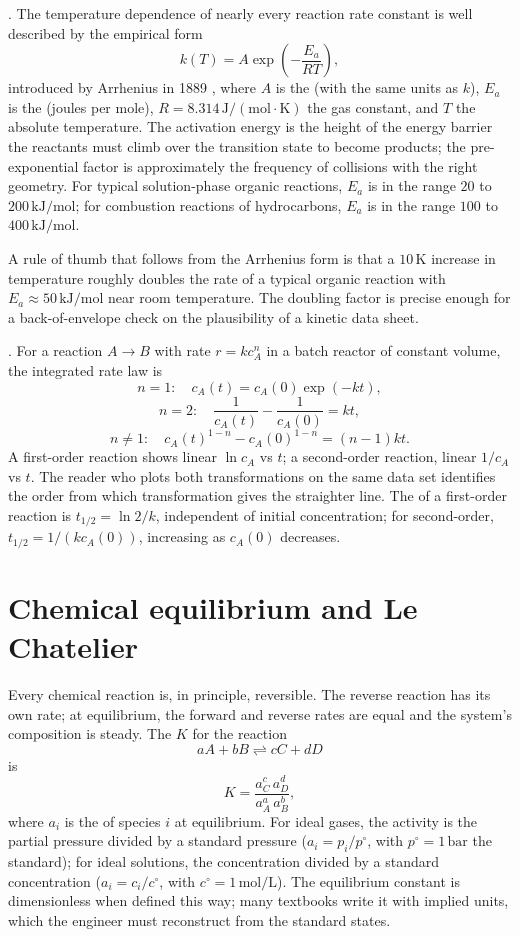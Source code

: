 . The temperature dependence of nearly
every reaction rate constant is well described by the empirical form
\[
k(T) = A \exp\left(-\frac{E_a}{R T}\right),
\]
introduced by Arrhenius in 1889 \cite{hist:arrhenius1889}, where $A$
is the  (with the same units as $k$),
$E_a$ is the  (joules per mole), $R =
8.314\,\text{J}/(\text{mol}\cdot\si{\kelvin})$ the gas constant, and
$T$ the absolute temperature. The activation energy is the height of
the energy barrier the reactants must climb over the transition state
to become products; the pre-exponential factor is approximately the
frequency of collisions with the right geometry. For typical
solution-phase organic reactions, $E_a$ is in the range $20$ to $200\,
\text{kJ}/\text{mol}$; for combustion reactions of hydrocarbons,
$E_a$ is in the range $100$ to $400\,\text{kJ}/\text{mol}$.

A rule of thumb that follows from the Arrhenius form is that a
$10\,\si{\kelvin}$ increase in temperature roughly doubles the rate
of a typical organic reaction with $E_a \approx 50\,\text{kJ}/\text{mol}$
near room temperature. The doubling factor is precise enough for a
back-of-envelope check on the plausibility of a kinetic data sheet.

. For a reaction $A \to B$ with
rate $r = k c_A^n$ in a batch reactor of constant volume, the
integrated rate law is
\[
n = 1: \quad c_A(t) = c_A(0) \exp(-k t),
\]
\[
n = 2: \quad \frac{1}{c_A(t)} - \frac{1}{c_A(0)} = k t,
\]
\[
n \neq 1: \quad c_A(t)^{1-n} - c_A(0)^{1-n} = (n-1) k t.
\]
A first-order reaction shows linear $\ln c_A$ vs $t$; a second-order
reaction, linear $1/c_A$ vs $t$. The reader who plots both
transformations on the same data set identifies the order from which
transformation gives the straighter line. The  of a
first-order reaction is $t_{1/2} = \ln 2/k$, independent of initial
concentration; for second-order, $t_{1/2} = 1/(k c_A(0))$, increasing
as $c_A(0)$ decreases.

\section{Chemical equilibrium and Le Chatelier}

Every chemical reaction is, in principle, reversible. The reverse
reaction has its own rate; at equilibrium, the forward and reverse
rates are equal and the system's composition is steady. The
 $K$ for the reaction
\[
aA + bB \rightleftharpoons cC + dD
\]
is
\[
K = \frac{a_C^c \, a_D^d}{a_A^a \, a_B^b},
\]
where $a_i$ is the  of species $i$ at equilibrium.
For ideal gases, the activity is the partial pressure divided by a
standard pressure ($a_i = p_i/p^\circ$, with $p^\circ = 1\,\text{bar}$
the standard); for ideal solutions, the concentration divided by a
standard concentration ($a_i = c_i/c^\circ$, with $c^\circ = 1\,
\text{mol}/\text{L}$). The equilibrium constant is dimensionless when
defined this way; many textbooks write it with implied units, which
the engineer must reconstruct from the standard states.

